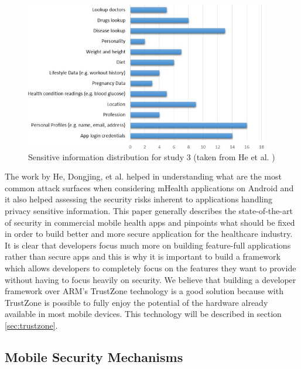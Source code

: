 \begin{figure}[t!]
  \centering
  \includegraphics[width=0.95\textwidth]{img/sensitivedistribution.jpg}
  \caption{Sensitive information distribution for study 3 (taken from  He et al. \cite{he2014security})}
  \label{fig:sensitivedistribution}
\end{figure}

The work by He, Dongjing, et al. \cite{he2014security} helped in understanding what are the most common attack surfaces when considering mHealth applications on Android and it also helped assessing the security risks inherent to applications handling privacy sensitive information. This paper generally describes the state-of-the-art of security in commercial mobile health apps and pinpoints what should be fixed in order to build better and more secure application for the healthcare industry. It is clear that developers focus much more on building feature-full applications rather than secure apps and this is why it is important to build a framework which allows developers to completely focus on the features they want to provide without having to focus heavily on security. We believe that building a developer framework over ARM's TrustZone technology is a good solution because with TrustZone is possible to fully enjoy the potential of the hardware already available in most mobile devices. This technology will be described in section \ref{sec:trustzone}. 

\subsection{Mobile Security Mechanisms}

